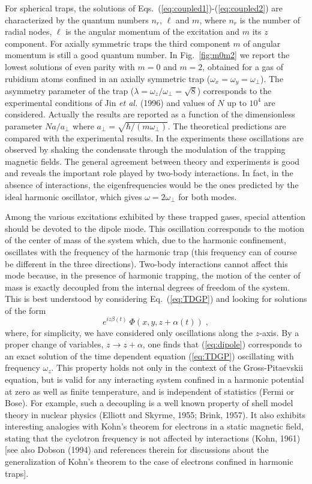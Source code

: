 For spherical traps, the solutions of 
Eqs.~(\ref{eq:coupled1})-(\ref{eq:coupled2}) are 
characterized by the quantum  numbers $n_r$, $\ell$ and $m$, where $n_r$ 
is the number of radial nodes, $\ell$ is the angular momentum of the 
excitation and $m$  its $z$ component. For axially symmetric 
traps the third  component $m$ of angular momentum is still a good quantum
number. In  Fig.~\ref{fig:m0m2} we report  the lowest solutions
of even parity with $m=0$ and $m=2$, obtained  for a gas of rubidium
atoms confined in an axially symmetric trap ($\omega_x=\omega_y=
\omega_{\perp}$).  The asymmetry parameter of the trap ($\lambda
= \omega_z / \omega_{\perp} = \sqrt{8}$) corresponds to the experimental
conditions of Jin {\it et al.} (1996) and values of $N$ up to $10^4$
are  considered. Actually the results are reported as a function of
the dimensionless parameter $N a/ a_\perp$ where $a_\perp=
\sqrt{\hbar/(m\omega_\perp)}$.  The theoretical predictions are compared
with   the experimental results. In the experiments these oscillations
are observed by shaking the condensate through the modulation of the
trapping magnetic  fields.  The general  agreement between theory and
experiments is good and reveals the  important role played by two-body
interactions.  In fact, in the absence  of interactions, the
eigenfrequencies would be  the ones predicted by  the ideal harmonic
oscillator, which gives  $\omega = 2 \omega_\perp$ for both modes.

Among the various excitations exhibited by these trapped gases,
special attention should be devoted to the dipole mode. This oscillation
corresponds to the motion of the center of mass of the system which, due
to the harmonic confinement, oscillates with the frequency of the harmonic
trap (this frequency can of course be different in the three directions).
Two-body interactions cannot affect this mode because, in the presence of
harmonic trapping, the motion of the center of mass is exactly decoupled 
from the internal degrees of freedom of the system.  This is best 
understood by considering Eq.~(\ref{eq:TDGP}) and looking for solutions 
of the form 
\begin{equation}
e^{iz\beta(t)} \ \Phi(x,y,z+\alpha(t))\; ,
\label{eq:dipole}
\end{equation}
where, for simplicity, we have considered only oscillations along the
$z$-axis. By a proper change of variables,  $z \to z+ \alpha$, one finds
that (\ref{eq:dipole}) corresponds to an exact solution of
the time dependent equation (\ref{eq:TDGP}) oscillating with frequency
$\omega_z$. This property holds not only in the context of
the Gross-Pitaevskii equation, but is valid for any interacting system
confined in a harmonic potential at zero as well as finite temperature,
and is independent of statistics (Fermi or Bose). For example, such a 
decoupling is a well known property of shell model theory in nuclear 
physics (Elliott and Skyrme, 1955; Brink, 1957). It also exhibits 
interesting analogies with Kohn's theorem for electrons in a static 
magnetic field, stating that the cyclotron frequency is not affected by 
interactions (Kohn, 1961) [see also Dobson (1994) and references 
therein for discussions about the generalization of Kohn's theorem to 
the case of electrons confined in harmonic traps].   

